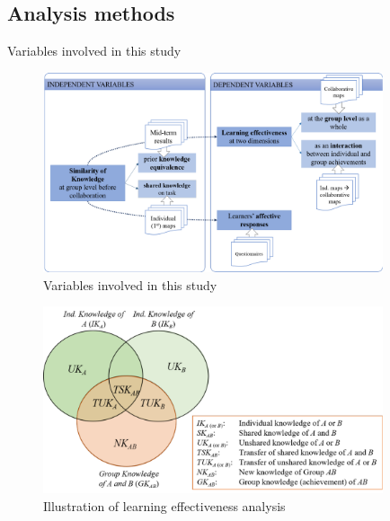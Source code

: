 \subsection{Analysis methods}
\begin{frame}{Variables involved in this study}
    \begin{figure}[tb]
     \begin{center}
      \includegraphics[width=100mm]{images/rqb_variables.pdf}
      \end{center}
      \caption{Variables involved in this study}
      \label{variables}  
\end{figure}
\end{frame}

\begin{frame}
    \begin{figure}[tb]
     \begin{center}
      \includegraphics[width=100mm]{images/rqb_learning_effectiveness.pdf}
      \end{center}
      \caption{Illustration of learning effectiveness analysis}
      \label{learn-effective}  
    \end{figure}
\end{frame}

